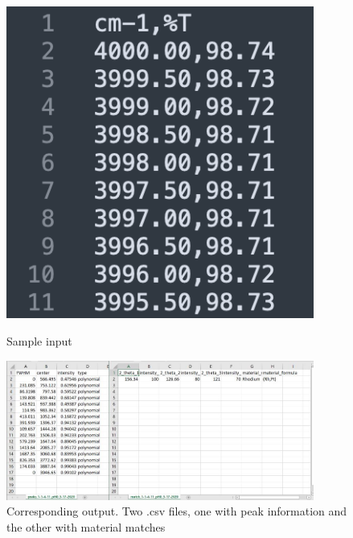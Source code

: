 \documentclass{dhbenelux}
\begin{document}
\begin{figure}[!h]
    \centering
    \begin{minipage}{0.45\textwidth}
        \centering
        \includegraphics[width=0.9\textwidth]{APC524_input.png} %
        \caption{Sample input}
        \label{fig:input}
    \end{minipage}\hfill
    \begin{minipage}{0.45\textwidth}
        \centering
        \includegraphics[width=0.9\textwidth]{APC_output.jpg} %
        \caption{Corresponding output. Two .csv files, one with peak information and the other with material matches}
        \label{fig:output}
    \end{minipage}
\end{figure}
\end{document}
